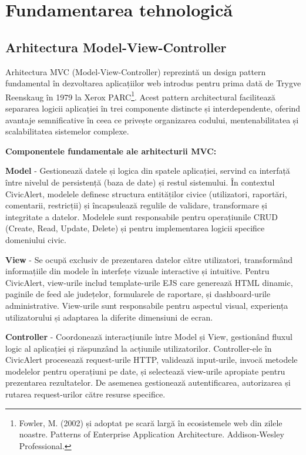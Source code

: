 \documentclass[12pt,a4paper]{report}
\begin{document}
\chapter{Fundamentarea tehnologică}

\section{Arhitectura Model-View-Controller}

Arhitectura MVC (Model-View-Controller) reprezintă un design pattern fundamental în dezvoltarea aplicațiilor web introdus pentru prima dată de Trygve Reenskaug în 1979 la Xerox PARC\footnote{Fowler, M. (2002) și adoptat pe scară largă în ecosistemele web din zilele noastre. Patterns of Enterprise Application Architecture. Addison-Wesley Professional.}. Acest pattern architectural facilitează separarea logicii aplicației în trei componente distincte și interdependente, oferind avantaje semnificative în ceea ce privește organizarea codului, mentenabilitatea și scalabilitatea sistemelor complexe.

\textbf{Componentele fundamentale ale arhitecturii MVC:}

\textbf{Model} - Gestionează datele și logica din spatele aplicației, servind ca interfață între nivelul de persistență (baza de date) și restul sistemului. În contextul CivicAlert, modelele definesc structura entităților civice (utilizatori, raportări, comentarii, restricții) și încapsulează regulile de validare, transformare și integritate a datelor. Modelele sunt responsabile pentru operațiunile CRUD (Create, Read, Update, Delete) și pentru implementarea logicii specifice domeniului civic.

\textbf{View} - Se ocupă exclusiv de prezentarea datelor către utilizatori, transformând informațiile din modele în interfețe vizuale interactive și intuitive. Pentru CivicAlert, view-urile includ template-urile EJS care generează HTML dinamic, paginile de feed ale județelor, formularele de raportare, și dashboard-urile administrative. View-urile sunt responsabile pentru aspectul visual, experiența utilizatorului și adaptarea la diferite dimensiuni de ecran.

\textbf{Controller} - Coordonează interacțiunile între Model și View, gestionând fluxul logic al aplicației și răspunzând la acțiunile utilizatorilor. Controller-ele în CivicAlert procesează request-urile HTTP, validează input-urile, invocă metodele modelelor pentru operațiuni pe date, și selectează view-urile apropiate pentru prezentarea rezultatelor. De asemenea gestionează autentificarea, autorizarea și rutarea request-urilor către resurse specifice.
\end{document}
